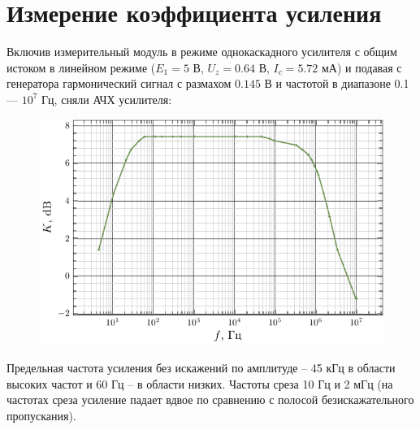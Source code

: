 \documentclass[a4paper,14pt]{extarticle}
\begin{document}






\section{Измерение коэффициента усиления}
Включив измерительный модуль в режиме однокаскадного усилителя с общим истоком в линейном режиме ($E_1=5$ В, $U_z=0.64$ В, $I_c=5.72$ мА) и подавая с генератора гармонический сигнал с размахом $0.145$ В и частотой в диапазоне 0.1 --- $10^7$ Гц, сняли АЧХ усилителя:
\begin{figure}[H]
	\centering
	\includegraphics[scale=1.5]{fig/k_from_f.pdf}
	\vspace{-1em}
	\label{fig:arf}
\end{figure}

Предельная частота усиления без искажений по амплитуде -- 45 кГц в области высоких частот и 60 Гц -- в области низких. Частоты среза 10 Гц и 2 мГц (на частотах среза усиление падает вдвое по сравнению с полосой безискажательного пропускания).

\vspace{-1em}
\end{document}
